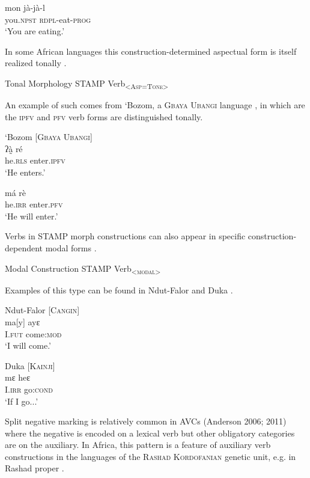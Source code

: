 \documentclass[output=paper]{langsci/langscibook}
\begin{document}
\ex \label{ex:anderson:20b}
\gll  mon    jà-jà-l \\
  you.\textsc{npst}  \textsc{rdpl}-eat-\textsc{prog}\\
\glt `You are eating.'
\z
\z 

In some African languages this construction-determined aspectual form is itself realized tonally .

\ea\label{ex:anderson:21}
  Tonal Morphology  STAMP   Verb\textsc{\textsubscript{<Asp=Tone>}}
\z

An example of such comes from `Bozom, a \textsc{Gbaya Ubangi} language , in which are the \textsc{ipfv} and \textsc{pfv} verb forms are distinguished tonally.

\ea\label{ex:anderson:22}
`Bozom   \citep[159]{Monino1995}        [\textsc{Gbaya Ubangi}]\\
\ea\label{ex:anderson:22a}
\gll ʔà̰    ré  \\
  he\textsc{.rls}     enter.\textsc{ipfv}\\
\glt `He enters.' 

\ex \label{ex:anderson:22b}
\gll  má  rè \\
  he\textsc{.irr}  enter\textsc{.pfv}\\
\glt `He will enter.'
\z
\z

Verbs in STAMP morph constructions can also appear in specific construction-dependent modal forms . 


\ea\label{ex:anderson:23}
Modal Construction  STAMP  Verb\textsubscript{<}\textsc{\textsubscript{modal}}\textsubscript{>}\\
\z

Examples of this type can be found in Ndut-Falor  and Duka .

\ea\label{ex:anderson:24}
Ndut-Falor \citep[Ndut-Falor 4]{Pichl1973}      [\textsc{Cangin}]\\
\gll ma[y]  ayɛ\\
I.\textsc{fut}  come:\textsc{mod}  \\
\glt `I will come.' 
\z

\ea\label{ex:anderson:25}
 Duka  \citep[96-98; 105]{BendorSamuelEtAl1973}    \textsc{[Kainji]}\\
 \gll mɛ    heɛ   \\
I.\textsc{irr}  go:\textsc{cond}  \\
\glt `If I go...'  
\z

Split negative marking is relatively common in AVCs (Anderson 2006; 2011) where the negative is encoded on a lexical verb but other obligatory categories are on the auxiliary. In Africa, this pattern is a feature of auxiliary verb constructions in the languages of the \textsc{Rashad Kordofanian} genetic unit, e.g. in Rashad proper .
\end{document}
